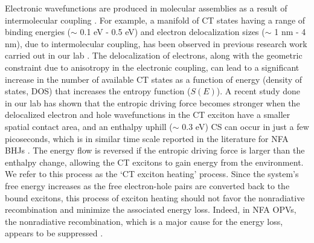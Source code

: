 \documentclass[12pt]{article}
\begin{document}
Electronic wavefunctions are produced in molecular assemblies as a result of intermolecular coupling \cite{bredas2004charge,scholes2006erratum}. For example, a manifold of CT states having a range of binding energies ($\sim$ 0.1 eV - 0.5 eV) and electron delocalization sizes ($\sim$ 1 nm - 4 nm), due to intermolecular coupling, has been observed in previous research work carried out in our lab \cite{wang2017multidimensional}. The delocalization of electrons, along with the geometric constraint due to anisotropy in the electronic coupling, can lead to a significant increase in the number of available CT states as a function of energy (density of states, DOS) that increases the entropy function ($S(E)$). A recent study done in our lab has shown that the entropic driving force becomes stronger when the delocalized electron and hole wavefunctions in the CT exciton have a smaller spatial contact area, and an enthalpy uphill ($\sim$ 0.3 eV) CS can occur in just a few picoseconds, which is in similar time scale reported in the literature for NFA BHJs \cite{kafle2020spontaneous}. The energy flow is reversed if the entropic driving force is larger than the enthalpy change, allowing the CT excitons to gain energy from the environment. We refer to this process as the \lq{CT exciton heating}' process. Since the system's free energy increases as the free electron-hole pairs are converted back to the bound excitons, this process of exciton heating should not favor the nonradiative recombination and minimize the associated energy loss. Indeed, in NFA OPVs, the nonradiative recombination, which is a major cause for the energy loss, appears to be suppressed \cite{ostroverkhova2016organic}.
\end{document}
